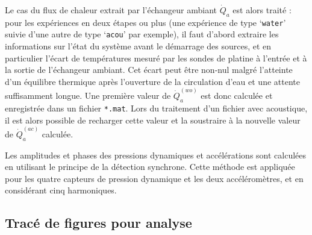 Le cas du flux de chaleur extrait par l'échangeur ambiant $\dot Q_a$ est alors traité : pour les expériences en deux étapes ou plus (une expérience de type `\texttt{water}' suivie d'une autre de type `\texttt{acou}' par exemple), il faut d'abord extraire les informations sur l'état du système avant le démarrage des sources, et en particulier l'écart de températures mesuré par les sondes de platine à l'entrée et à la sortie de l'échangeur ambiant. Cet écart peut être non-nul malgré l'atteinte d'un équilibre thermique après l'ouverture de la circulation d'eau et une attente suffisamment longue. Une première valeur de $\dot Q_a^{(wo)}$ est donc calculée et enregistrée dans un fichier \texttt{*.mat}. Lors du traitement d'un fichier avec acoustique, il est alors possible de recharger cette valeur et la soustraire à la nouvelle valeur de $\dot Q_a^{(ac)}$ calculée.\smallskip

Les amplitudes et phases des pressions dynamiques et accélérations sont calculées en utilisant le principe de la détection synchrone. Cette méthode est appliquée pour les quatre capteurs de pression dynamique et les deux accéléromètres, et en considérant cinq harmoniques.





\subsection{Tracé de figures pour analyse}

